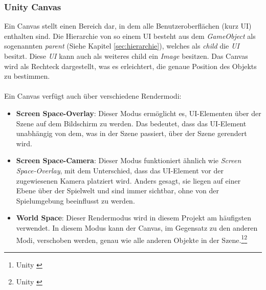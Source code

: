 \subsubsection{\label{sec:Canvas}Unity Canvas}
Ein Canvas stellt einen Bereich dar, in dem alle Benutzeroberflächen (kurz UI) enthalten sind. Die Hierarchie von so einem UI besteht aus dem \textit{GameObject} als sogenannten \textit{parent} (Siehe Kapitel \ref{sec:hierarchie}), welches als \textit{child} die \textit{UI} besitzt. Diese \textit{UI}
kann auch als weiteres child ein \textit{Image} besitzen. Das Canvas wird als Rechteck dargestellt, was es erleichtert, die genaue Position des Objekts zu bestimmen.\\
\\
Ein Canvas verfügt auch über verschiedene Rendermodi:
\begin{itemize}

    \item\textbf{Screen Space-Overlay}: Dieser Modus ermöglicht es, UI-Elementen über der Szene auf dem Bildschirm zu werden. Das bedeutet, dass das UI-Element unabhängig von dem, was in der Szene passiert, über der Szene gerendert wird.

    \item\textbf{Screen Space-Camera}: Dieser Modus funktioniert ähnlich wie \textit{Screen Space-Overlay}, mit dem Unterschied, dass das UI-Element vor der zugewiesenen Kamera platziert wird. Anders gesagt, sie liegen auf einer Ebene über der Spielwelt und sind immer sichtbar, ohne von der Spielumgebung beeinflusst zu werden.

    \item\textbf{World Space}: Dieser Rendermodus wird in diesem Projekt am häufigsten verwendet. In diesem Modus kann der Canvas, im Gegensatz zu den anderen Modi, verschoben werden, genau wie alle anderen Objekte in der Szene.\protect\footnote{Unity \cite{Canvas}}\protect\footnote{Unity \cite{Renderer}}
\end{itemize}

